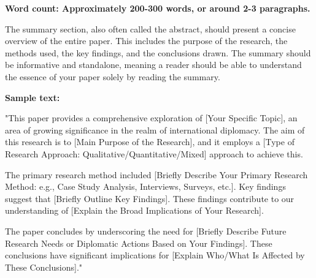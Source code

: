 
\textbf{Word count: Approximately 200-300 words, or around 2-3 paragraphs.}

The summary section, also often called the abstract, should present a concise overview of the entire paper. This includes the purpose of the research, the methods used, the key findings, and the conclusions drawn. The summary should be informative and standalone, meaning a reader should be able to understand the essence of your paper solely by reading the summary.

\textbf{Sample text:}

"This paper provides a comprehensive exploration of [Your Specific Topic], an area of growing significance in the realm of international diplomacy. The aim of this research is to [Main Purpose of the Research], and it employs a [Type of Research Approach: Qualitative/Quantitative/Mixed] approach to achieve this.

The primary research method included [Briefly Describe Your Primary Research Method: e.g., Case Study Analysis, Interviews, Surveys, etc.]. Key findings suggest that [Briefly Outline Key Findings]. These findings contribute to our understanding of [Explain the Broad Implications of Your Research].

The paper concludes by underscoring the need for [Briefly Describe Future Research Needs or Diplomatic Actions Based on Your Findings]. These conclusions have significant implications for [Explain Who/What Is Affected by These Conclusions]."